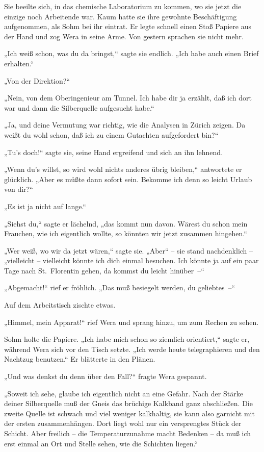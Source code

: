Sie beeilte sich, in das chemische Laboratorium zu kommen, wo sie
jetzt die einzige noch Arbeitende war. Kaum hatte sie ihre gewohnte
Beschäftigung aufgenommen, als Sohm bei ihr eintrat. Er legte
schnell einen Stoß Papiere aus der Hand und zog Wera in seine Arme.
Von gestern sprachen sie nicht mehr.

„Ich weiß schon, was du da bringst,“ sagte sie endlich. „Ich habe
auch einen Brief erhalten.“

„Von der Direktion?“

„Nein, von dem Oberingenieur am Tunnel. Ich habe dir ja erzählt,
daß ich dort war und dann die Silberquelle aufgesucht habe.“

„Ja, und deine Vermutung war richtig, wie die Analysen in Zürich
zeigen. Da weißt du wohl schon, daß ich zu einem Gutachten
aufgefordert bin?“

„Tu's doch!“ sagte sie, seine Hand ergreifend und sich an ihn
lehnend.

„Wenn du's willst, so wird wohl nichts anderes übrig bleiben,“
antwortete er glücklich. „Aber es müßte dann sofort sein. Bekomme
ich denn so leicht Urlaub von dir?“

„Es ist ja nicht auf lange.“

„Siehst du,“ sagte er lächelnd, „das kommt nun davon. Wärest du
schon mein Frauchen, wie ich eigentlich wollte, so könnten wir
jetzt zusammen hingehen.“

„Wer weiß, wo wir da jetzt wären,“ sagte sie. „Aber“ – sie stand
nachdenklich – „vielleicht – vielleicht könnte ich dich einmal
besuchen. Ich könnte ja auf ein paar Tage nach St.~Florentin gehen,
da kommst du leicht hinüber~–“

„Abgemacht!“ rief er fröhlich. „Das muß besiegelt werden, du
geliebtes~–“

Auf dem Arbeitstisch zischte etwas.

„Himmel, mein Apparat!“ rief Wera und sprang hinzu, um zum Rechen
zu sehen.

Sohm holte die Papiere. „Ich habe mich schon so ziemlich
orientiert,“ sagte er, während Wera sich vor den Tisch setzte. „Ich
werde heute telegraphieren und den Nachtzug benutzen.“ Er blätterte
in den Plänen.

„Und was denkst du denn über den Fall?“ fragte Wera gespannt.

„Soweit ich sehe, glaube ich eigentlich nicht an eine Gefahr. Nach
der Stärke deiner Silberquelle muß der Gneis das brüchige Kalkband
ganz abschließen. Die zweite Quelle ist schwach und viel weniger
kalkhaltig, sie kann also garnicht mit der ersten zusammenhängen.
Dort liegt wohl nur ein versprengtes Stück der Schicht. Aber
freilich – die Temperaturzunahme macht Bedenken – da muß ich erst
einmal an Ort und Stelle sehen, wie die Schichten liegen.“

